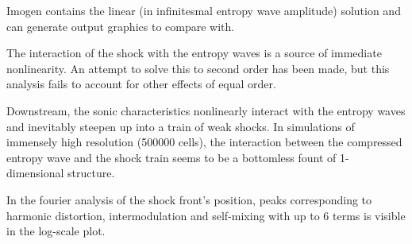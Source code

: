 Imogen contains the linear (in infinitesmal entropy wave amplitude) solution and can generate output graphics to compare with.

The interaction of the shock with the entropy waves is a source of immediate nonlinearity. An attempt to solve this to second
order has been made, but this analysis fails to account for other effects of equal order.

Downstream, the sonic characteristics nonlinearly interact with the entropy waves and inevitably steepen up into a train of weak shocks.
In simulations of immensely high resolution (500000 cells), the interaction between the compressed entropy wave and the shock train
seems to be a bottomless fount of 1-dimensional structure.

In the fourier analysis of the shock front's position, peaks corresponding to harmonic distortion, intermodulation 
and self-mixing with up to 6 terms is visible in the log-scale plot. 

